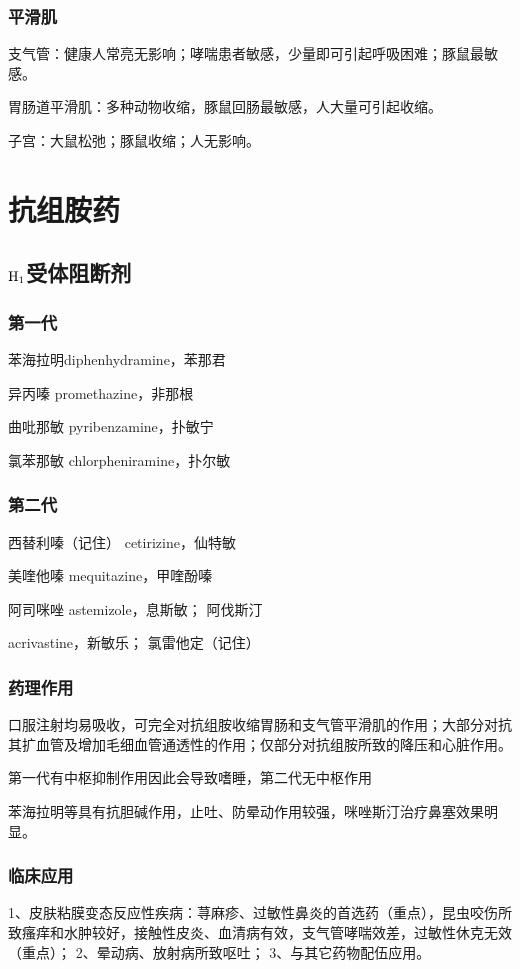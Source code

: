 \documentclass[UTF8]{ctexbook}
\begin{document}
\subsubsection{平滑肌}
支气管：健康人常亮无影响；哮喘患者敏感，少量即可引起呼吸困难；豚鼠最敏感。

胃肠道平滑肌：多种动物收缩，豚鼠回肠最敏感，人大量可引起收缩。

子宫：大鼠松弛；豚鼠收缩；人无影响。

\section{抗组胺药}
\subsection{\(\textup{H}_{1}\)受体阻断剂}
\subsubsection{第一代}
苯海拉明diphenhydramine，苯那君

异丙嗪 promethazine，非那根

曲吡那敏 pyribenzamine，扑敏宁

氯苯那敏 chlorpheniramine，扑尔敏
\subsubsection{第二代}
西替利嗪（记住） cetirizine，仙特敏

美喹他嗪 mequitazine，甲喹酚嗪

阿司咪唑 astemizole，息斯敏； 阿伐斯汀

acrivastine，新敏乐； 氯雷他定（记住）
\subsubsection{药理作用}
口服注射均易吸收，可完全对抗组胺收缩胃肠和支气管平滑肌的作用；大部分对抗其扩血管及增加毛细血管通透性的作用；仅部分对抗组胺所致的降压和心脏作用。

第一代有中枢抑制作用因此会导致嗜睡，第二代无中枢作用

苯海拉明等具有抗胆碱作用，止吐、防晕动作用较强，咪唑斯汀治疗鼻塞效果明显。

\subsubsection{临床应用}
1、皮肤粘膜变态反应性疾病：荨麻疹、过敏性鼻炎的首选药（重点），昆虫咬伤所致瘙痒和水肿较好，接触性皮炎、血清病有效，支气管哮喘效差，过敏性休克无效（重点）；
2、晕动病、放射病所致呕吐；
3、与其它药物配伍应用。
\end{document}

